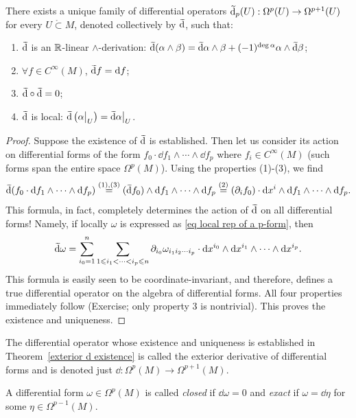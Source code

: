 \begin{thm}\label{exterior d existence}
    There exists a unique family of differential operators $\wt{\dd}_p(U):\Omega^p(U)\to \Omega^{p+1}(U)$ for every $U\mathring\subset M$, denoted collectively by $\wt\dd$, such that:
\begin{enumerate}
    \item $\wt\dd$ is an $\mathbb{R} $-linear $\wedge$-derivation: $\wt\dd(\alpha\wedge\beta)=\wt\dd\alpha\wedge\beta+(-1)^{\deg\alpha}\alpha\wedge\wt\dd\beta$;
    \item $\forall f\in C^\infty(M)$, $\wt\dd f=\dd f$;
    \item $\wt\dd\circ\wt\dd=0$;
    \item $\wt\dd$ is local: $\wt\dd\left(\restr{\alpha}{U}\right)=\restr{\wt\dd\alpha}{U}$.
\end{enumerate}
\end{thm}
\begin{proof}
    Suppose the existence of $\wt\dd$ is established. Then let us consider its action on differential forms of the form $f_0\cdot \dd f_1\wedge \cdots \wedge \dd f_p$ where $f_i\in C^\infty(M)$ (such forms span the entire space $\Omega^p(M)$). Using the properties (1)-(3), we find
    \[\wt\dd (f_0\cdot \dd f_1\wedge \cdots \wedge \dd f_p)\overset{(1),(3)}{=}(\wt\dd f_0) \wedge \dd f_1\wedge \cdots \wedge \dd f_p\overset{(2)}{=}(\partial_i f_0)\cdot \dd x^i\wedge \dd f_1\wedge \cdots \wedge \dd f_p.\]
    This formula, in fact, completely determines the action of $\wt\dd$ on all differential forms! Namely, if locally $\omega$ is expressed as \eqref{eq local rep of a p-form}, then
    \[\wt\dd \omega =\sum_{i_0=1}^n\sum_{1\leq i_1<\cdots <i_p\leq n}\partial_{i_0}\omega_{i_1 i_2\cdots i_p}\cdot \dd x^{i_0}\wedge \dd x^{i_1}\wedge\cdots\wedge \dd x^{i_p}.\label{eq local formula for d}\]
    This formula is easily seen to be coordinate-invariant, and therefore, defines a true differential operator on the algebra of differential forms. All four properties immediately follow (Exercise; only property 3 is nontrivial). This proves the existence and uniqueness.
\end{proof}

\begin{defn}
    The differential operator whose existence and uniqueness is established in Theorem~\ref{exterior d existence} is called the exterior derivative of differential forms and is denoted just $\dd:\Omega^p(M)\to\Omega^{p+1}(M)$.

    A differential form $\omega\in\Omega^p(M)$ is called \emph{closed} if $\dd\omega=0$ and \emph{exact} if $\omega=\dd\eta$ for some $\eta\in\Omega^{p-1}(M)$. 
\end{defn}

